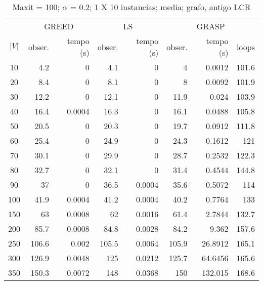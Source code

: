 \documentclass[]{article}
\begin{document}
\begin {table}[h]
\centering
\caption{Maxit = 100; $\alpha$ = 0.2; 1 X 10 instancias; media; grafo, antigo LCR}
\begin{small}
	\begin{tabular}{|c|r|r|r|r|r|r|r|}
		\hline
		& \multicolumn{2}{c|}{GREED} & \multicolumn{2}{c|}{LS} & \multicolumn{3}{c|}{GRASP} \\ 
		\cline{2-8}
		$|V|$   &  obser. & tempo (s)  & obser. & tempo (s) & obser. & tempo (s) & loops\\ 
		\hline
		10 & 4.2 & 0 & 4.1 & 0 & 4 & 0.0012 & 101.6 \\ 
		20 & 8.4 & 0 & 8.1 & 0 & 8 & 0.0092 & 101.9 \\ 
		30 & 12.2 & 0 & 12.1 & 0 & 11.9 & 0.024 & 103.9 \\ 
		40 & 16.4 & 0.0004 & 16.3 & 0 & 16.1 & 0.0488 & 105.8 \\ 
		50 & 20.5 & 0 & 20.3 & 0 & 19.7 & 0.0912 & 111.8 \\ 
		60 & 25.4 & 0 & 24.9 & 0 & 24.3 & 0.1612 & 121 \\ 
		70 & 30.1 & 0 & 29.9 & 0 & 28.7 & 0.2532 & 122.3 \\ 
		80 & 32.7 & 0 & 32.1 & 0 & 31.4 & 0.4544 & 144.8 \\ 
		90 & 37 & 0 & 36.5 & 0.0004 & 35.6 & 0.5072 & 114 \\ 
		100 & 41.9 & 0.0004 & 41.2 & 0.0004 & 40.2 & 0.7764 & 133 \\ 
		150 & 63 & 0.0008 & 62 & 0.0016 & 61.4 & 2.7844 & 132.7 \\ 
		200 & 85.7 & 0.0008 & 84.8 & 0.0028 & 84.2 & 9.362 & 157.6 \\ 
		250 & 106.6 & 0.002 & 105.5 & 0.0064 & 105.9 & 26.8912 & 165.1 \\ 
		300 & 126.9 & 0.0048 & 125 & 0.0212 & 125.7 & 64.6456 & 165.6 \\ 
		350 & 150.3 & 0.0072 & 148 & 0.0368 & 150 & 132.015 & 168.6 \\ 
		\hline
	\end{tabular} \label{}
\end{small}
\end{table}
\end{document}
